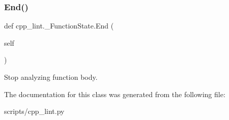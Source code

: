 \subsubsection{\texorpdfstring{End()}{End()}}
{\footnotesize\ttfamily def cpp\+\_\+lint.\+\_\+\+Function\+State.\+End (\begin{DoxyParamCaption}\item[{}]{self }\end{DoxyParamCaption})}

\begin{DoxyVerb}Stop analyzing function body.\end{DoxyVerb}
 

The documentation for this class was generated from the following file\+:\begin{DoxyCompactItemize}
\item 
scripts/cpp\+\_\+lint.\+py\end{DoxyCompactItemize}
